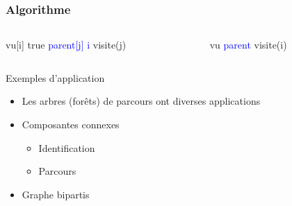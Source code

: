 \begin{frame}[fragile]
\frametitle{Algorithme}
    \begin{columns}
        \begin{column}{.5\textwidth}
            \begin{algorithmic}[1]
                \State vu[i] \gets true
                        \State \textcolor{blue}{parent[j] \gets i}
                        \State visite(j)
                    \EndIf
                \EndFor
                \EndFunction
            \end{algorithmic}
        \end{column}
        \begin{column}{.5\textwidth}
            \begin{algorithmic}[1]
                \State vu 
                \State \textcolor{blue}{parent \gets [$-1$,...,$-1$]}
                    \State visite(i)
                    \EndIf
                \EndFor
                \end{algorithmic}            
        \end{column}
    \end{columns}    
\end{frame}



\begin{frame}{Exemples d'application}
    \begin{itemize}
        \item Les arbres (forêts) de parcours ont diverses applications
        \item Composantes connexes 
        \begin{itemize}
            \item Identification
            \item Parcours 
        \end{itemize}
        \item Graphe bipartis
    \end{itemize}
\end{frame}


